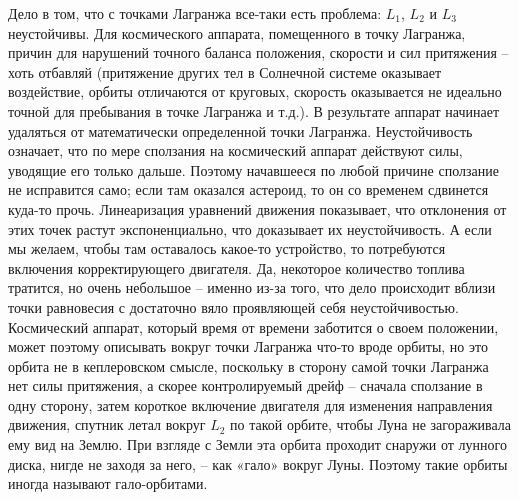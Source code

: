 \documentclass[a4paper,12pt]{article}
\begin{document}
Дело в том, что с точками Лагранжа все-таки есть проблема: $L_1$, $L_2$ и $L_3$ неустойчивы.
Для космического аппарата, помещенного в точку Лагранжа, причин для нарушений точного баланса положения, скорости и сил притяжения – 
хоть отбавляй (притяжение других тел в Солнечной системе оказывает воздействие, орбиты отличаются от круговых, 
скорость оказывается не идеально точной для пребывания в точке Лагранжа и т.д.).
В результате аппарат начинает удаляться от математически определенной точки Лагранжа.
Неустойчивость означает, что по мере сползания на космический аппарат действуют силы, уводящие его только дальше.
Поэтому начавшееся по любой причине сползание не исправится само;
если там оказался астероид, то он со временем сдвинется куда-то прочь.
Линеаризация уравнений движения показывает, что отклонения от этих точек растут экспоненциально, что доказывает их неустойчивость.
А если мы желаем, чтобы там оставалось какое-то устройство, то потребуются включения корректирующего двигателя.
Да, некоторое количество топлива тратится, но очень небольшое – именно из-за того, что дело происходит вблизи точки равновесия
с достаточно вяло проявляющей себя неустойчивостью.
Космический аппарат, который время от времени заботится о своем положении, может поэтому описывать вокруг точки Лагранжа
что-то вроде орбиты, но это орбита не в кеплеровском смысле, поскольку в сторону самой
точки Лагранжа нет силы притяжения, а скорее контролируемый дрейф – сначала сползание
в одну сторону, затем короткое включение двигателя для изменения направления движения,
спутник летал вокруг $L_2$ по такой орбите, чтобы Луна не загораживала ему вид на Землю. При
взгляде с Земли эта орбита проходит снаружи от лунного диска, нигде не заходя за него, – как
«гало» вокруг Луны. Поэтому такие орбиты иногда называют гало-орбитами.
\end{document}
